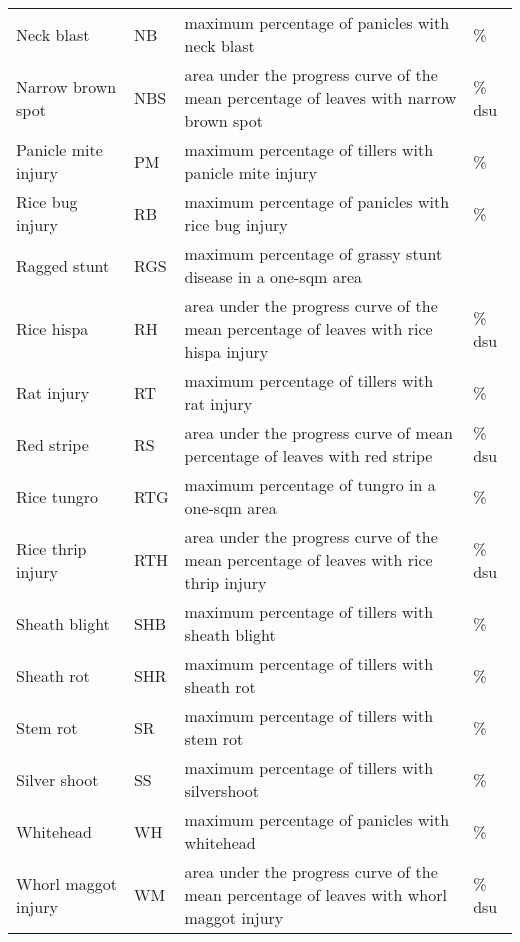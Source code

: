 \begin{table}[!h]
\begin{tabular}{llll}
Neck blast            & NB      & maximum percentage of panicles with neck blast                                            & \%     \\
Narrow brown spot     & NBS     & area under the progress curve of the mean percentage of leaves with narrow brown spot     & \% dsu \\
Panicle mite  injury          & PM      & maximum percentage of tillers with panicle mite injury                                    & \%     \\
Rice bug injury       & RB      & maximum percentage of panicles with rice bug injury                                       & \%     \\
Ragged stunt     & RGS     & maximum percentage of grassy stunt disease in a one-sqm area                              &        \\
Rice hispa            & RH      & area under the progress curve of the mean percentage of leaves with rice hispa injury     & \% dsu \\
Rat injury            & RT      & maximum percentage of tillers with rat injury                                             & \%     \\
Red stripe            & RS      & area under the progress curve of mean percentage of leaves with red stripe                & \% dsu \\
Rice tungro           & RTG     & maximum percentage of tungro in a one-sqm area                                            & \%     \\
Rice thrip injury           & RTH     & area under the progress curve of the mean percentage of leaves with rice thrip injury     & \% dsu \\
Sheath blight         & SHB     & maximum percentage of tillers with sheath blight                                          & \%     \\
Sheath rot            & SHR     & maximum percentage of tillers with sheath rot                                             & \%     \\
Stem rot              & SR      & maximum percentage of tillers with stem rot                                               & \%     \\
Silver shoot          & SS      & maximum percentage of tillers with silvershoot                                            & \%     \\
Whitehead             & WH      & maximum percentage of panicles with whitehead                                             & \%     \\
Whorl maggot injury         & WM      & area under the progress curve of the mean percentage of leaves with whorl maggot injury   & \% dsu \\
\hline
\end{tabular}
\end{table}